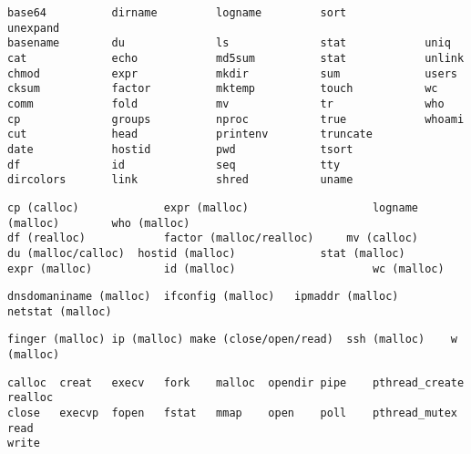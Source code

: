 
\iffalse
cat ~/ReturnValueTester/test\_dir/utils.txt.bak | egrep -v '^#|^$' | cut -d "|" -f 1 | sort > utils_used.txt
ls -f -a -1 ~/Downloads/coreutils-8.25/src/*.c | rev | cut -d "/" -f 1 | rev | cut -d "." -f 1 | sort > coreutils.txt 
comm utils_used.txt coreutils.txt -12 | column -c 80
\fi

\begin{minipage}{\linewidth}
\begin{lstlisting}[label={lst:coreutils},caption={GNU Core Utilities tested}]
base64          dirname         logname         sort            unexpand
basename        du              ls              stat            uniq
cat             echo            md5sum          stat            unlink
chmod           expr            mkdir           sum             users
cksum           factor          mktemp          touch           wc
comm            fold            mv              tr              who
cp              groups          nproc           true            whoami
cut             head            printenv        truncate
date            hostid          pwd             tsort
df              id              seq             tty
dircolors       link            shred           uname
\end{lstlisting}
\end{minipage}


\begin{lstlisting}[label={lst:coreutils_crashes},caption={Crashes in GNU Core Utilities}]
cp (calloc)				expr (malloc)					logname (malloc)		who (malloc)
df (realloc)			factor (malloc/realloc)		mv (calloc)
du (malloc/calloc)	hostid (malloc)				stat (malloc)
expr (malloc)			id (malloc)						wc (malloc)
\end{lstlisting}

\begin{lstlisting}[label={lst:net-tools_crashes},caption={Crashes in net-tools}]
dnsdomaniname (malloc)	ifconfig (malloc)	ipmaddr (malloc)	netstat (malloc)
\end{lstlisting}

\begin{lstlisting}[label={lst:other_crashes},caption={Crashes in Other Utilities}]
finger (malloc)	ip (malloc)	make (close/open/read)	ssh (malloc)	w (malloc)
\end{lstlisting}

\begin{lstlisting}[label={lst:coreutils_wrappers},caption={Wrapped calls for testing Command-line Utilities}]
calloc  creat   execv   fork    malloc  opendir pipe    pthread_create 	realloc
close   execvp  fopen   fstat   mmap    open    poll    pthread_mutex	read    
write
\end{lstlisting}

